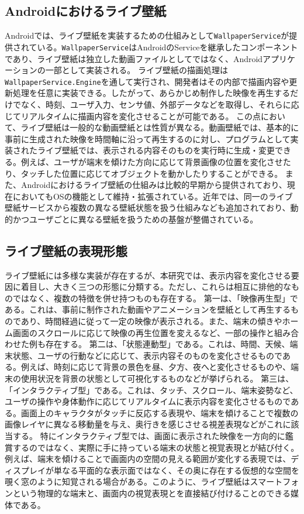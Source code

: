 \subsection{Androidにおけるライブ壁紙}
Androidでは、ライブ壁紙を実装するための仕組みとして\texttt{WallpaperService}が提供されている\cite{androidWallpaperService}。\texttt{WallpaperService}はAndroidのServiceを継承したコンポーネントであり、ライブ壁紙は独立した動画ファイルとしてではなく、Androidアプリケーションの一部として実装される。
ライブ壁紙の描画処理は\texttt{WallpaperService.Engine}を通して実行され、開発者はその内部で描画内容や更新処理を任意に実装できる。したがって、あらかじめ制作した映像を再生するだけでなく、時刻、ユーザ入力、センサ値、外部データなどを取得し、それらに応じてリアルタイムに描画内容を変化させることが可能である。
この点において、ライブ壁紙は一般的な動画壁紙とは性質が異なる。動画壁紙では、基本的に事前に生成された映像を時間軸に沿って再生するのに対し、プログラムとして実装されたライブ壁紙では、表示される内容そのものを実行時に生成・変更できる。例えば、ユーザが端末を傾けた方向に応じて背景画像の位置を変化させたり、タッチした位置に応じてオブジェクトを動かしたりすることができる。
また、Androidにおけるライブ壁紙の仕組みは比較的早期から提供されており、現在においてもOSの機能として維持・拡張されている。近年では、同一のライブ壁紙サービスから複数の異なる壁紙状態を扱う仕組みなども追加されており、動的かつユーザごとに異なる壁紙を扱うための基盤が整備されている\cite{android16Wallpaper}。
\subsection{ライブ壁紙の表現形態}
ライブ壁紙には多様な実装が存在するが、本研究では、表示内容を変化させる要因に着目し、大きく三つの形態に分類する。ただし、これらは相互に排他的なものではなく、複数の特徴を併せ持つものも存在する。
第一は、「映像再生型」である。これは、事前に制作された動画やアニメーションを壁紙として再生するものであり、時間経過に従って一定の映像が表示される。また、端末の傾きやホーム画面のスクロールに応じて映像の再生位置を変えるなど、一部の操作と組み合わせた例も存在する。
第二は、「状態連動型」である。これは、時間、天候、端末状態、ユーザの行動などに応じて、表示内容そのものを変化させるものである。例えば、時刻に応じて背景の景色を昼、夕方、夜へと変化させるものや、端末の使用状況を背景の状態として可視化するものなどが挙げられる。
第三は、「インタラクティブ型」である。これは、タッチ、スクロール、端末姿勢など、ユーザの操作や身体動作に応じてリアルタイムに表示内容を変化させるものである。画面上のキャラクタがタッチに反応する表現や、端末を傾けることで複数の画像レイヤに異なる移動量を与え、奥行きを感じさせる視差表現などがこれに該当する。
特にインタラクティブ型では、画面に表示された映像を一方向的に鑑賞するのではなく、実際に手に持っている端末の状態と視覚表現とが結び付く。例えば、端末を傾けることで画面内の空間の見える範囲が変化する表現では、ディスプレイが単なる平面的な表示面ではなく、その奥に存在する仮想的な空間を覗く窓のように知覚される場合がある。このように、ライブ壁紙はスマートフォンという物理的な端末と、画面内の視覚表現とを直接結び付けることのできる媒体である。
